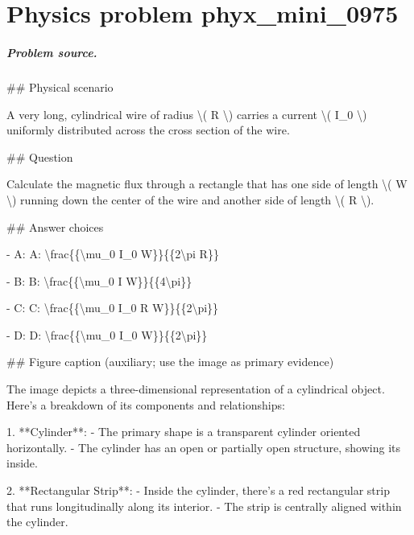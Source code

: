 
\chapter{Physics problem phyx\_mini\_0975}
\label{ch:PhyXMiniProblems_problem_phyx_mini_0975}

\paragraph{Problem source.}
\#\# Physical scenario

A very long, cylindrical wire of radius \textbackslash{}( R \textbackslash{}) carries a current \textbackslash{}( I\_0 \textbackslash{}) uniformly distributed across the cross section of the wire.

\#\# Question

Calculate the magnetic flux through a rectangle that has one side of length \textbackslash{}( W \textbackslash{}) running down the center of the wire and another side of length \textbackslash{}( R \textbackslash{}).

\#\# Answer choices

- A: A: \textbackslash{}frac\{\{\textbackslash{}mu\_0 I\_0 W\}\}\{\{2\textbackslash{}pi R\}\}

- B: B: \textbackslash{}frac\{\{\textbackslash{}mu\_0 I W\}\}\{\{4\textbackslash{}pi\}\}

- C: C: \textbackslash{}frac\{\{\textbackslash{}mu\_0 I\_0 R W\}\}\{\{2\textbackslash{}pi\}\}

- D: D: \textbackslash{}frac\{\{\textbackslash{}mu\_0 I\_0 W\}\}\{\{2\textbackslash{}pi\}\}

\#\# Figure caption (auxiliary; use the image as primary evidence)

The image depicts a three-dimensional representation of a cylindrical object. Here's a breakdown of its components and relationships:

1. **Cylinder**: 
   - The primary shape is a transparent cylinder oriented horizontally.
   - The cylinder has an open or partially open structure, showing its inside.

2. **Rectangular Strip**: 
   - Inside the cylinder, there's a red rectangular strip that runs longitudinally along its interior.
   - The strip is centrally aligned within the cylinder.

